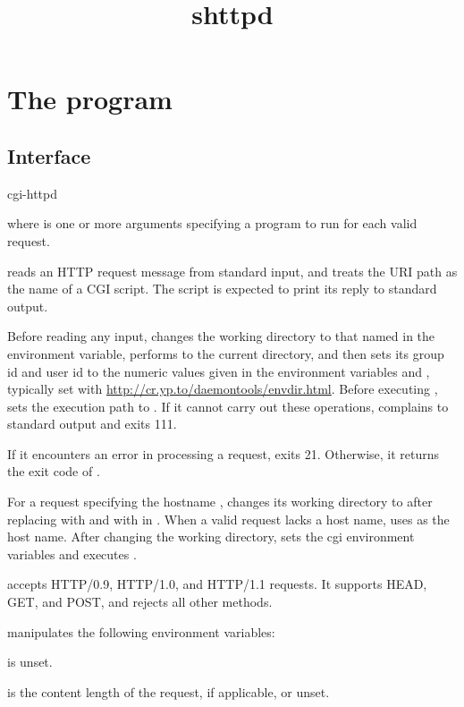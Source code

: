 \documentclass{book}
\title{shttpd}
\begin{document}
\section{The  program}

\subsection{Interface}
\begin{code}
  cgi-httpd 
\end{code}
where  is one or more arguments specifying a program to run
for each valid request.

 reads an HTTP request message from standard input,
and treats the URI path as the name of a CGI script.  The script is
expected to print its reply to standard output.

Before reading any input,  changes the working directory to that
named in the  environment variable, performs  to the
current directory, and then sets its group id and user id to the numeric values
given in the environment variables  and , typically set
with \href{\cmd{envdir}}{http://cr.yp.to/daemontools/envdir.html}.  Before
executing ,  sets the execution path to .
If it cannot carry out these operations,  complains to standard
output and exits 111.

If it encounters an error in processing a request, 
exits 21.  Otherwise, it returns the exit code of .

For a request specifying the hostname , 
changes its working directory to  after replacing
  with \cmd{/:} and \cmd{//} with \cmd{/} in
.  When a valid request lacks a host name,
 uses  as the host name.  After changing the
working directory,  sets the cgi environment variables
and executes .

 accepts HTTP/0.9, HTTP/1.0, and HTTP/1.1 requests.  It
supports HEAD, GET, and POST, and rejects all other methods.

 manipulates the following environment variables:

 is unset.

 is the content length of the request, if
applicable, or unset.
\end{document}

